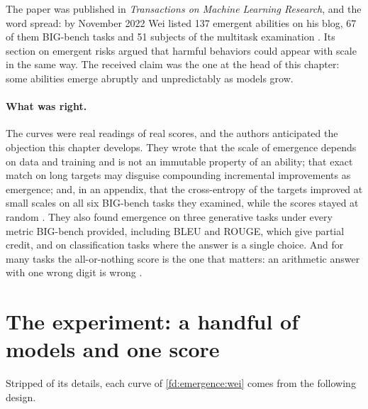 \begin{refsection}
The paper was published in \emph{Transactions on Machine Learning Research}, and the word spread: by November 2022 Wei listed 137 emergent abilities on his blog, 67 of them BIG-bench tasks and 51 subjects of the multitask examination \parencite{Wei2022Blog}. Its section on emergent risks argued that harmful behaviors could appear with scale in the same way. The received claim was the one at the head of this chapter: some abilities emerge abruptly and unpredictably as models grow.

\paragraph{What was right.} The curves were real readings of real scores, and the authors anticipated the objection this chapter develops. They wrote that the scale of emergence depends on data and training and is not an immutable property of an ability; that exact match on long targets may disguise compounding incremental improvements as emergence; and, in an appendix, that the cross-entropy of the targets improved at small scales on all six BIG-bench tasks they examined, while the scores stayed at random \parencite{WeiEtAl2022}. They also found emergence on three generative tasks under every metric BIG-bench provided, including BLEU and ROUGE, which give partial credit, and on classification tasks where the answer is a single choice. And for many tasks the all-or-nothing score is the one that matters: an arithmetic answer with one wrong digit is wrong \parencite{Wei2023Blog}.

\section{The experiment: a handful of models and one score}\label{sec:emergence:experiment}

Stripped of its details, each curve of \cref{fd:emergence:wei} comes from the following design.

\begin{experiment}
\end{experiment}


\end{refsection}
